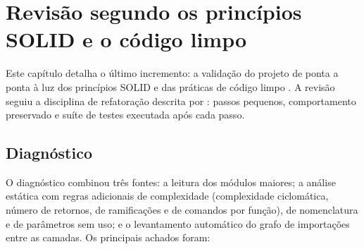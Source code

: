 \chapter{Revisão segundo os princípios SOLID e o código limpo}

Este capítulo detalha o último incremento: a validação do projeto de ponta a ponta à luz dos princípios
SOLID \cite{martin2003} e das práticas de código limpo \cite{martin2009}. A revisão seguiu a disciplina
de refatoração descrita por \textcite{fowler2018}: passos pequenos, comportamento preservado e suíte de
testes executada após cada passo.

\section{Diagnóstico}

O diagnóstico combinou três fontes: a leitura dos módulos maiores; a análise estática com regras
adicionais de complexidade (complexidade ciclomática, número de retornos, de ramificações e de comandos
por função), de nomenclatura e de parâmetros sem uso; e o levantamento automático do grafo de
importações entre as camadas. Os principais achados foram:

